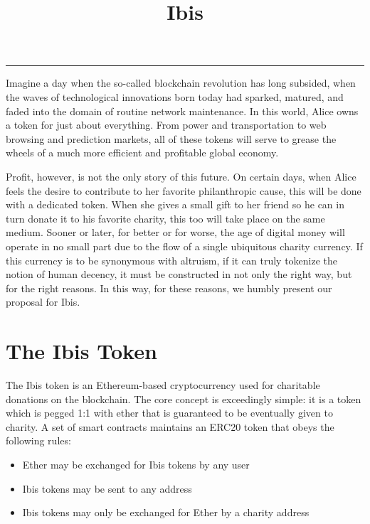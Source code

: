\documentclass{article} \usepackage{parskip}
\title{\vspace{-5ex}Ibis}
\date{\vspace{-10ex}}
\begin{document}
\maketitle
\noindent\rule{\textwidth}{1pt}

Imagine a day when the so-called blockchain revolution has long subsided, when
the waves of technological innovations born today had sparked, matured, and
faded into the domain of routine network maintenance. In this world, Alice owns
a token for just about everything. From power and transportation to web browsing
and prediction markets, all of these tokens will serve to grease the wheels of a
much more efficient and profitable global economy.

Profit, however, is not the only story of this future. On certain days, when
Alice feels the desire to contribute to her favorite philanthropic cause, this
will be done with a dedicated token. When she gives a small gift to her friend
so he can in turn donate it to his favorite charity, this too will take place on
the same medium. Sooner or later, for better or for worse, the age of digital
money will operate in no small part due to the flow of a single ubiquitous
charity currency. If this currency is to be synonymous with altruism, if it can
truly tokenize the notion of human decency, it must be constructed in not only
the right way, but for the right reasons. In this way, for these reasons, we
humbly present our proposal for Ibis.

\section{The Ibis Token}

The Ibis token is an Ethereum-based cryptocurrency used for charitable donations
on the blockchain. The core concept is exceedingly simple: it is a token which
is pegged 1:1 with ether that is guaranteed to be eventually given to charity. A
set of smart contracts maintains an ERC20 token that obeys the following rules:

\begin{itemize}
\item Ether may be exchanged for Ibis tokens by any user
\item Ibis tokens may be sent to any address
\item Ibis tokens may only be exchanged for Ether by a charity address
\end{itemize}
\end{document}
